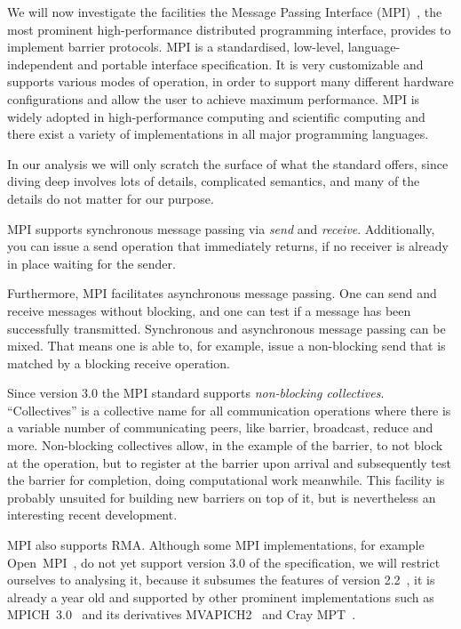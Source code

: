 \documentclass[a4paper, 10pt]{article}
\begin{document}
We will now investigate the facilities the Message Passing Interface (MPI)~\cite{mpi3}, the most prominent high-performance distributed programming interface, provides to implement barrier protocols. MPI is a standardised, low-level, language-independent and portable interface specification. It is very customizable and supports various modes of operation, in order to support many different hardware configurations and allow the user to achieve maximum performance. MPI is widely adopted in high-performance computing and scientific computing\cite{mpiadoptiona, mpiadoptionb, mpiadoptionc} and there exist a variety of implementations in all major programming languages.

In our analysis we will only scratch the surface of what the standard offers, since diving deep involves lots of details, complicated semantics, and many of the details do not matter for our purpose.

MPI supports synchronous message passing via \emph{send} and \emph{receive}. Additionally, you can issue a send operation that immediately returns, if no receiver is already in place waiting for the sender.

Furthermore, MPI facilitates asynchronous message passing. One can send and receive messages without blocking, and one can test if a message has been successfully transmitted. Synchronous and asynchronous message passing can be mixed. That means one is able to, for example, issue a non-blocking send that is matched by a blocking receive operation.

Since version 3.0 the MPI standard supports \emph{non-blocking collectives}. ``Collectives'' is a collective name for all communication operations where there is a variable number of communicating  peers, like barrier, broadcast, reduce and more.
Non-blocking collectives allow, in the example of the barrier, to not block at the operation, but to register at the barrier upon arrival and subsequently test the barrier for completion, doing computational work meanwhile.
This facility is probably unsuited for building new barriers on top of it, but is nevertheless an interesting recent development.

MPI also supports RMA. Although some MPI implementations, for example Open~MPI~\cite{openmpi}, do not yet support version 3.0 of the specification, we will restrict ourselves to analysing it, because it subsumes the features of version 2.2~\cite{mpi2}, it is already a year old and supported by other prominent implementations such as MPICH~3.0~\cite{mpich} and its derivatives MVAPICH2~\cite{mvapich} and Cray MPT~\cite{craympt}.
\end{document}
